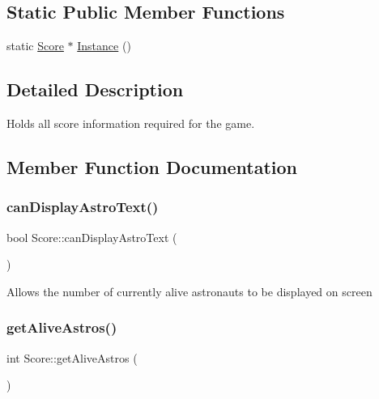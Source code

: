 \subsection*{Static Public Member Functions}
\begin{DoxyCompactItemize}
\item 
static \hyperlink{class_score}{Score} $\ast$ \hyperlink{class_score_a7d5516454642a247be184d5063404d04}{Instance} ()
\end{DoxyCompactItemize}


\subsection{Detailed Description}
Holds all score information required for the game. 



\subsection{Member Function Documentation}
\mbox{\label{class_score_a915cd675992bb150fcd67b43f7b8732e}} 
\subsubsection{\texorpdfstring{can\+Display\+Astro\+Text()}{canDisplayAstroText()}}
{\footnotesize\ttfamily bool Score\+::can\+Display\+Astro\+Text (\begin{DoxyParamCaption}{ }\end{DoxyParamCaption})}

Allows the number of currently alive astronauts to be displayed on screen \mbox{\label{class_score_ad997fd059028945d10cfc8c056540a4f}} 
\subsubsection{\texorpdfstring{get\+Alive\+Astros()}{getAliveAstros()}}
{\footnotesize\ttfamily int Score\+::get\+Alive\+Astros (\begin{DoxyParamCaption}{ }\end{DoxyParamCaption})}

